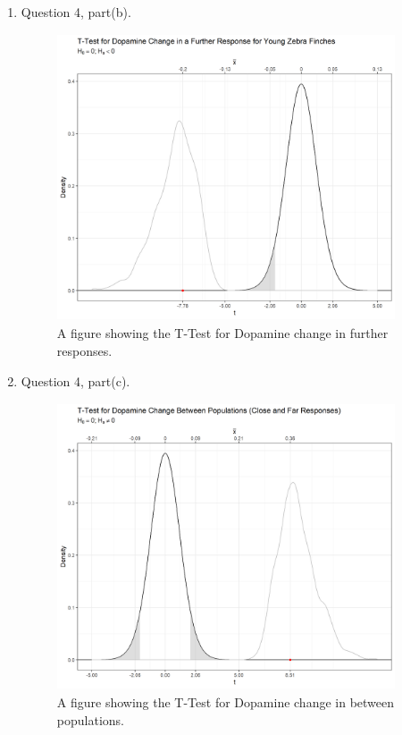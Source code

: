 \documentclass{article}\usepackage[]{graphicx}\usepackage[]{xcolor}
\begin{document}
\begin{enumerate}
\begin{enumerate}
  \item Question 4, part(b).
  \begin{figure}[H]
\centering
\includegraphics[width=10cm, height=8.5cm]{task5plot2.png}
\caption{A figure showing the T-Test for Dopamine change in further responses.}
\label{plot3}
\end{figure}

\newpage
\item Question 4, part(c).
   \begin{figure}[H]
\centering
\includegraphics[width=10cm, height=8.5cm]{task5plot3.png}
\caption{A figure showing the T-Test for Dopamine change in between populations.}
\label{plot4}
\end{figure}

\end{enumerate}
\end{enumerate}


\end{document}
